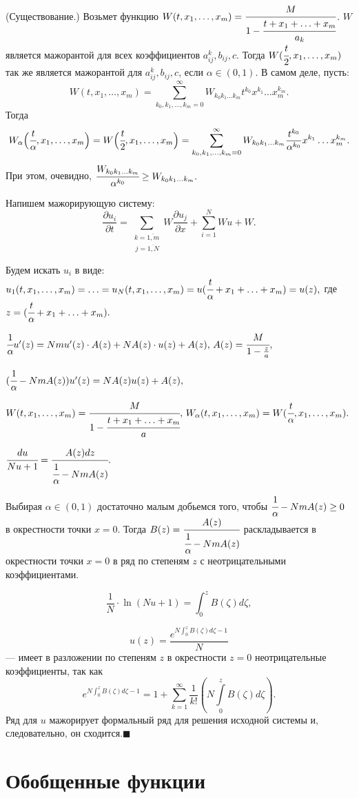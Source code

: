 \documentclass[unicode,12pt,draft]{article}
\begin{document}
(Существование.) Возьмет функцию $W(t,x_1,\ldots,x_m)=\cfrac
M{1-\cfrac{t+x_1+\ldots+x_m}{a_k}}$. $W$ является мажорантой для
всех коэффициентов $a_{ij}^k,b_{ij},c.$ Тогда $W(\cfrac
t2,x_1,\ldots,x_m)$ так же является мажорантой для
$a_{ij}^k,b_{ij},c$, если $\alpha \in (0,1).$ В самом деле, пусть:
$$W(t,x_1,\ldots,x_m)=\sum_{k_0,k_1,\ldots,k_m=0}^{\infty}W_{k_0 k_1\ldots k_m}t^{k_0}x^{k_1}\ldots x_m^{k_m}.$$
Тогда $$W_{\alpha}\Bigl(\cfrac t
{\alpha},x_1,\ldots,x_m\Bigr)=W\Bigl(\cfrac
t2,x_1,\ldots,x_m\Bigr)=\sum_{k_0,k_1,\ldots,k_m=0}^{\infty}W_{k_0
k_1\ldots k_m}\frac {t^{k_0}}{\alpha^{k_0}}x^{k_1}\ldots
x_m^{k_m}.$$ При этом, очевидно, $\cfrac {W_{k_0 k_1\ldots
k_m}}{\alpha^{k_0}}\ge W_{k_0 k_1\ldots k_m}.$

Напишем мажорирующую систему:
$$\frac{\partial u_i}{\partial t}=
\sum_{\substack{k=\overline {1,m}\\\,j=\overline {1,N}}}W
\frac{\partial u_j}{\partial x}+\sum_{i=1}^N W u+W.$$

Будем искать $u_i$ в виде:
$u_1(t,x_1,\ldots,x_m)=\ldots=u_N(t,x_1,\ldots,x_m)=u(\cfrac t
{\alpha}+x_1+\ldots+x_m)=u(z),$ где $z=(\cfrac t
{\alpha}+x_1+\ldots+x_m).$

$\cfrac1{\alpha}u'(z)=N m u'(z)\cdot A(z)+N A(z) \cdot u(z)+A(z),
\, A(z)=\cfrac M{1-\frac za},$

$(\cfrac1{\alpha}-N m A(z))u'(z)=N A(z) u(z)+A(z),$

$W(t,x_1,\ldots,x_m)=\cfrac M{1-\cfrac{t+x_1+\ldots+x_m}a},\,
W_{\alpha}(t,x_1,\ldots,x_m)=W(\cfrac t {\alpha},x_1,\ldots,x_m).$

$\cfrac {du}{Nu+1}=\cfrac {A(z)dz}{\cfrac1{\alpha}-N m A(z)}.$

Выбирая $\alpha \in (0,1)$ достаточно малым добьемся того, чтобы
$\cfrac1{\alpha}-N m A(z)\ge0$ в окрестности точки $x=0$. Тогда
$B(z)=\cfrac {A(z)}{\cfrac1{\alpha}-N m A(z)}$ раскладывается в
окрестности точки $x=0$ в ряд по степеням $z$ с неотрицательными
коэффициентами.

$$\frac1N\cdot \ln(Nu+1)=\int_0^zB(\zeta) d\zeta,$$

$$u(z)=\frac{e^{N\int_0^zB(\zeta) d\zeta-1}}N$$ --- имеет в
разложении по степеням $z$ в окрестности $z=0$ неотрицательные
коэффициенты, так как $$e^{N\int_0^zB(\zeta)
d\zeta-1}=1+\sum_{k=1}^{\infty}\frac1{k!}(N\int\limits_0^zB(\zeta)
d\zeta).$$ Ряд для $u$ мажорирует формальный ряд для решения
исходной системы и, следовательно, он сходится.$\blacksquare$


\section{Обобщенные функции}
\end{document}
